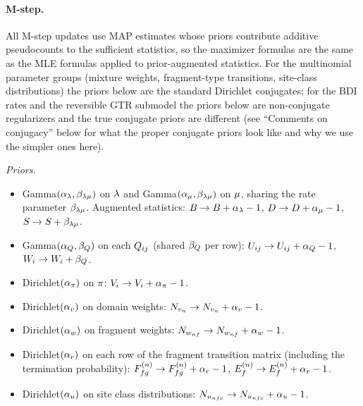 \paragraph{M-step.}
\label{sec:bw-mixdom-priors}
All M-step updates use MAP estimates whose priors contribute additive
pseudocounts to the sufficient statistics, so the maximizer formulas
are the same as the MLE formulas applied to prior-augmented statistics.
For the multinomial parameter groups (mixture weights, fragment-type
transitions, site-class distributions) the priors below are the
standard Dirichlet conjugates; for the BDI rates and the reversible
GTR submodel the priors below are non-conjugate regularizers and the
true conjugate priors are different (see ``Comments on conjugacy''
below for what the proper conjugate priors look like and why we use
the simpler ones here).

\emph{Priors.}
\begin{itemize}[nosep]
\item Gamma$(\alpha_\lambda, \beta_{\lambda\mu})$ on $\lambda$ and
  Gamma$(\alpha_\mu, \beta_{\lambda\mu})$ on $\mu$,
  sharing the rate parameter $\beta_{\lambda\mu}$.
  Augmented statistics:
  $B \to B + \alpha_\lambda - 1$,
  $D \to D + \alpha_\mu - 1$,
  $S \to S + \beta_{\lambda\mu}$.
\item Gamma$(\alpha_Q, \beta_Q)$ on each $Q_{ij}$
  (shared $\beta_Q$ per row):
  $U_{ij} \to U_{ij} + \alpha_Q - 1$,
  $W_i \to W_i + \beta_Q$.
\item Dirichlet$(\alpha_\pi)$ on $\pi$:
  $V_i \to V_i + \alpha_\pi - 1$.
\item Dirichlet$(\alpha_v)$ on domain weights:
  $N_{v_n} \to N_{v_n} + \alpha_v - 1$.
\item Dirichlet$(\alpha_w)$ on fragment weights:
  $N_{w_{nf}} \to N_{w_{nf}} + \alpha_w - 1$.
\item Dirichlet$(\alpha_r)$ on each row of the fragment transition matrix
  (including the termination probability):
  $F^{(n)}_{fg} \to F^{(n)}_{fg} + \alpha_r - 1$,
  $E^{(n)}_f \to E^{(n)}_f + \alpha_r - 1$.
\item Dirichlet$(\alpha_u)$ on site class distributions:
  $N_{u_{nfc}} \to N_{u_{nfc}} + \alpha_u - 1$.
\end{itemize}

